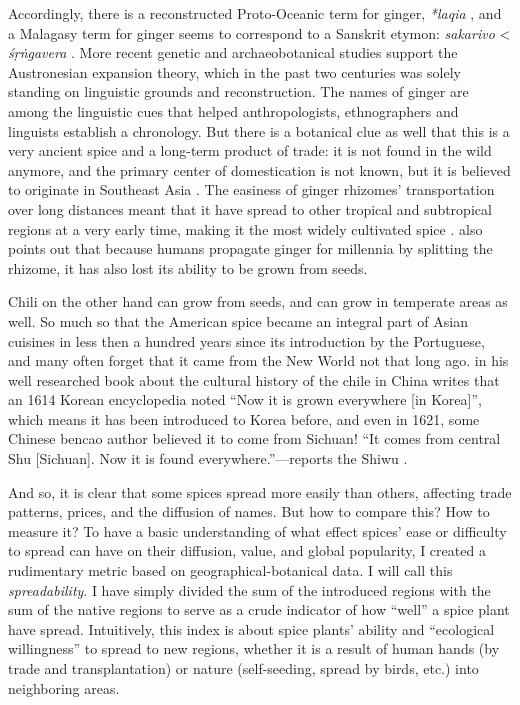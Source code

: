 Accordingly, there is a reconstructed Proto-Oceanic term for ginger, \textit{*laqia} \autocite[52]{bellwood_austronesians_2006}, and a Malagasy term for ginger seems to correspond to a Sanskrit etymon: \textit{sakarivo} < \textit{śṛṅgavera} \autocite[41]{adelaar_malay_1994}. More recent genetic and archaeobotanical studies support the Austronesian expansion theory, which in the past two centuries was solely standing on linguistic grounds and reconstruction. The names of ginger are among the linguistic cues that helped anthropologists, ethnographers and linguists establish a chronology. But there is a botanical clue as well that this is a very ancient spice and a long-term product of trade: it is not found in the wild anymore, and the primary center of domestication is not known, but it is believed to originate in Southeast Asia \autocite{ravindran_ginger_2005}. The easiness of ginger rhizomes' transportation over long distances meant that it have spread to other tropical and subtropical regions at a very early time, making it the most widely cultivated spice \autocite{lawrence_major_1984}. \textcite{dalby_dangerous_2000} also points out that because humans propagate ginger for millennia by splitting the rhizome, it has also lost its ability to be grown from seeds.

Chili on the other hand can grow from seeds, and can grow in temperate areas as well. So much so that the American spice became an integral part of Asian cuisines in less then a hundred years since its introduction by the Portuguese, and many often forget that it came from the New World not that long ago. \textcite{dott_chile_2020} in his well researched book about the cultural history of the chile in China writes that an 1614 Korean encyclopedia noted ``Now it is grown everywhere [in Korea]'', which means it has been introduced to Korea before, and even in 1621, some Chinese \gls{bencao} author believed it to come from Sichuan! ``It comes from central Shu [Sichuan]. Now it is found everywhere.''---reports the \gls{Shiwu} \autocite[24,28]{dott_chile_2020}.

And so, it is clear that some spices spread more easily than others, affecting trade patterns, prices, and the diffusion of names. But how to compare this? How to measure it? To have a basic understanding of what effect spices' ease or difficulty to spread can have on their diffusion, value, and global popularity, I created a rudimentary metric based on geographical-botanical data. I will call this \textit{spreadability}. I have simply divided the sum of the introduced regions with the sum of the native regions to serve as a crude indicator of how ``well'' a spice plant have spread. Intuitively, this index is about spice plants' ability and ``ecological willingness'' to spread to new regions, whether it is a result of human hands (by trade and transplantation) or nature (self-seeding, spread by birds, etc.) into neighboring areas. 

